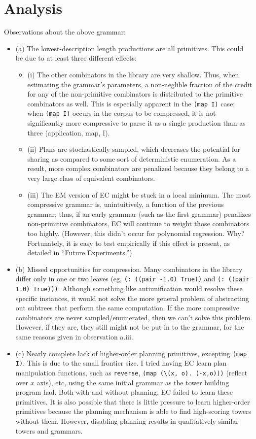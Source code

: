 \documentclass{article}
\begin{document}
\section{Analysis}
Observations about the above grammar:
\begin{itemize}
\item{(a)} The lowest-description length productions are all primitives. This could be due to at least three different effects:
\begin{itemize}
\item{(i)} The other combinators in the library are very shallow.
Thus, when estimating the grammar's parameters, a non-neglible fraction of the credit for any of the non-primitive combinators is distributed to the primitive combinators as well.
This is especially apparent in the \verb=(map I)= case; when \verb=(map I)= occurs in the corpus to be compressed, it is not significantly more compressive to parse it as a single production than as three (application, map, I).
\item{(ii)} Plans are stochastically sampled, which decreases the potential for sharing as compared to some sort of deterministic enumeration.
As a result, more complex combinators are penalized because they belong to a very large class of equivalent combinators.
\item{(iii)} The EM version of EC might be stuck in a local minimum. The most compressive grammar is, unintuitively, a function of the previous grammar; thus, if an early grammar (such as the first grammar) penalizes non-primitive combinators, EC will continue to weight those combinators too highly. (However, this didn't occur for polynomial regression. Why? Fortunately, it is easy to test empirically if this effect is present, as detailed in ``Future Experiments.'')
\end{itemize}
\item{(b)} Missed opportunities for compression. Many combinators in the library differ only in one or two leaves (eg, \verb=(: ((pair -1.0) True))= and \verb=(: ((pair 1.0) True)))=.
Although something like antiunification would resolve these specific instances, it would not solve the more general problem of abstracting out subtrees that perform the same computation.
If the more compressive combinators are never sampled/enumerated, then we can't solve this problem.
However, if they are, they still might not be put in to the grammar, for the same reasons given in observation a.iii.
\item{(c)} Nearly complete lack of higher-order planning primitives, excepting \verb=(map I)=. This is due to the small frontier size.
I tried having EC learn plan manipulation functions, such as \verb=reverse=, \verb=(map (\(x, o). (-x,o)))= (reflect over $x$ axis), etc, using the same initial grammar as the tower building program had.
Both with and without planning, EC failed to learn these primitives.
It is also possible that there is little pressure to learn higher-order primitives because the planning mechanism is able to find high-scoring towers without them.
However, disabling planning results in qualitatively similar towers and grammars.
\end{itemize}
\end{document}

